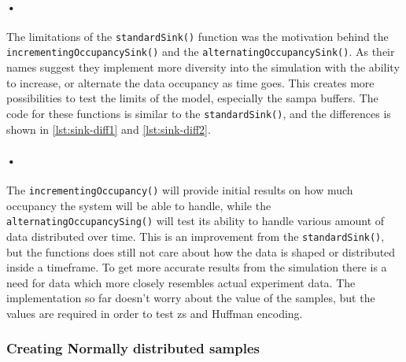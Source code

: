 \documentclass[a4paper, 12pt]{report}
\newcommand{\codeword}[1]{\texttt{#1}}
\begin{document}
\begin{minipage}{\linewidth}

\end{minipage}

\paragraph{•}
The limitations of the \codeword{standardSink()} function was the motivation behind the \codeword{incrementingOccupancySink()} and the \codeword{alternatingOccupancySink()}.
As their names suggest they implement more diversity into the simulation with the ability to increase, or alternate the data occupancy as time goes.
This creates more possibilities to test the limits of the model, especially the \gls{sampa} buffers.
The code for these functions is similar to the \codeword{standardSink()}, and the differences is shown in \ref{lst:sink-diff1} and \ref{lst:sink-diff2}.

\begin{minipage}{\linewidth}


\end{minipage}

\paragraph{•} 
The \codeword{incrementingOccupancy()} will provide initial results on how much occupancy the system will be able to handle, while the \codeword{alternatingOccupancySing()} will test its ability to handle various amount of data distributed over time.
This is an improvement from the \codeword{standardSink()}, but the functions does still not care about how the data is shaped or distributed inside a timeframe.
To get more accurate results from the simulation there is a need for data which more closely resembles actual experiment data.
The implementation so far doesn't worry about the value of the samples, but the values are required in order to test \gls{zs} and Huffman encoding.

\subsubsection{Creating Normally distributed samples}
\label{subsubsec:normal-distribution}
\end{document}
